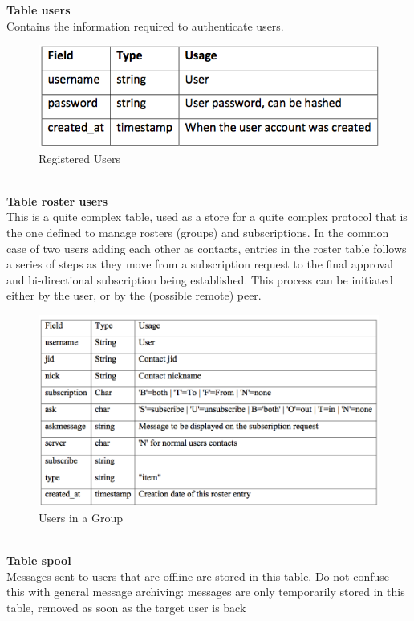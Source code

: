 \noindent \textbf{Table users}\\
\noindent Contains the information required to authenticate users. 
\begin{figure}[ht]
\centering
\includegraphics[scale=0.5]{input/images/t1.png}
\caption{Registered Users}
\end{figure}\\
\textbf{Table roster users}\\
\noindent This is a quite complex table, used as a store for a quite complex protocol that is the one defined to manage
rosters (groups) and subscriptions. In the common case of two users adding each other as contacts, entries
in the roster table follows a series of steps as they move from a subscription request to the final approval
and bi-directional subscription being established. This process can be initiated either by the user, or by the
(possible remote) peer.\\
\begin{figure}[ht]
\centering
\includegraphics[scale=0.4]{input/images/t2.png}
\caption{Users in a Group}
\end{figure}\\
\noindent \textbf{Table spool}\\
\noindent Messages sent to users that are offline are stored in this table. Do not confuse this with general message
archiving: messages are only temporarily stored in this table, removed as soon as the target user is back
